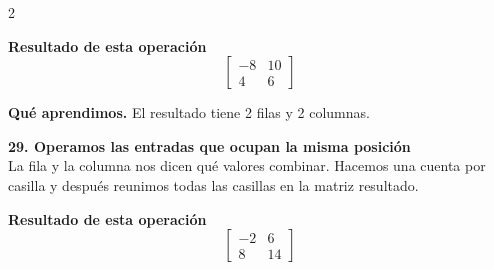 \documentclass[11pt,a4paper,landscape]{article}
\begin{document}
\begin{multicols*}{2}
\begin{minipage}{\linewidth}
\par{}\par\smallskip
\par\smallskip \textbf{Resultado de esta operación}\[\begin{bmatrix}-8 & 10\\4 & 6\end{bmatrix}\]
\par\smallskip\textbf{Qué aprendimos.} El resultado tiene 2 filas y 2 columnas.
\end{minipage}\par\medskip
\noindent\begin{minipage}{\linewidth}\textbf{29. Operamos las entradas que ocupan la misma posición}\\[2pt]La fila y la columna nos dicen qué valores combinar. Hacemos una cuenta por casilla y después reunimos todas las casillas en la matriz resultado.
\par{}\par\smallskip
\par\smallskip \textbf{Resultado de esta operación}\[\begin{bmatrix}-2 & 6\\8 & 14\end{bmatrix}\]

\end{minipage}
\end{multicols*}
\end{document}
